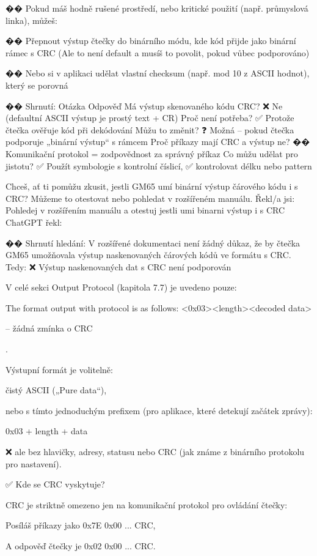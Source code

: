 �� Pokud máš hodně rušené prostředí, nebo kritické použití (např. průmyslová linka), můžeš:

    �� Přepnout výstup čtečky do binárního módu, kde kód přijde jako binární rámec s CRC
    (Ale to není default a musíš to povolit, pokud vůbec podporováno)

    �� Nebo si v aplikaci udělat vlastní checksum (např. mod 10 z ASCII hodnot), který se porovná

�� Shrnutí:
Otázka	Odpověď
Má výstup skenovaného kódu CRC?	❌ Ne (defaultní ASCII výstup je prostý text + CR)
Proč není potřeba?	✅ Protože čtečka ověřuje kód při dekódování
Můžu to změnit?	❓ Možná – pokud čtečka podporuje „binární výstup“ s rámcem
Proč příkazy mají CRC a výstup ne?	�� Komunikační protokol = zodpovědnost za správný příkaz
Co můžu udělat pro jistotu?	✅ Použít symbologie s kontrolní číslicí, ✅ kontrolovat délku nebo pattern

Chceš, ať ti pomůžu zkusit, jestli GM65 umí binární výstup čárového kódu i s CRC? Můžeme to otestovat nebo pohledat v rozšířeném manuálu.
Řekl/a jsi:
Pohledej v rozšířením manuálu a otestuj jestli umi binarni výstup i s CRC
ChatGPT řekl:

�� Shrnutí hledání: V rozšířené dokumentaci není žádný důkaz, že by čtečka GM65 umožňovala výstup naskenovaných čárových kódů ve formátu s CRC. Tedy:
❌ Výstup naskenovaných dat s CRC není podporován

    V celé sekci Output Protocol (kapitola 7.7) je uvedeno pouze:

The format output with protocol is as follows: <0x03><length><decoded data>

– žádná zmínka o CRC​

.

Výstupní formát je volitelně:

    čistý ASCII („Pure data“),

    nebo s tímto jednoduchým prefixem (pro aplikace, které detekují začátek zprávy):

        0x03 + length + data

        ❌ ale bez hlavičky, adresy, statusu nebo CRC (jak známe z binárního protokolu pro nastavení).

✅ Kde se CRC vyskytuje?

CRC je striktně omezeno jen na komunikační protokol pro ovládání čtečky:

    Posíláš příkazy jako 0x7E 0x00 ... CRC,

    A odpověď čtečky je 0x02 0x00 ... CRC.

